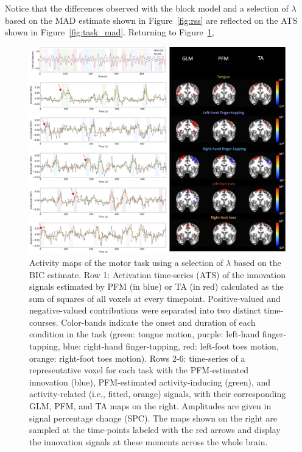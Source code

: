 Notice that the differences observed with the block model and a selection of $\lambda$ based on the MAD estimate shown in Figure~\ref{fig:rss} are reflected on the ATS shown in Figure~\ref{fig:task_mad}. Returning to Figure~\ref{fig:task_maps}, 


\begin{figure}[t!]
    \begin{center}
        \includegraphics[width=\textwidth]{figures/task_maps.png}
    \end{center}
    \caption{Activity maps of the motor task using a selection of $\lambda$ based on the BIC estimate. Row 1: Activation time-series (ATS) of the innovation signals estimated by PFM (in blue) or TA (in red) calculated as the sum of squares of all voxels at every timepoint. Positive-valued and negative-valued contributions were separated into two distinct time-courses. Color-bands indicate the onset and duration of each condition in the task (green: tongue motion, purple: left-hand finger-tapping, blue: right-hand finger-tapping, red: left-foot toes motion, orange: right-foot toes motion). Rows 2-6: time-series of a representative voxel for each task with the PFM-estimated innovation (blue), PFM-estimated activity-inducing (green), and activity-related (i.e., fitted, orange) signals, with their corresponding GLM, PFM, and TA maps on the right. Amplitudes are given in signal percentage change (SPC). The maps shown on the right are sampled at the time-points labeled with the red arrows and display the innovation signals at these moments across the whole brain. }
\label{fig:task_maps}
\end{figure}

